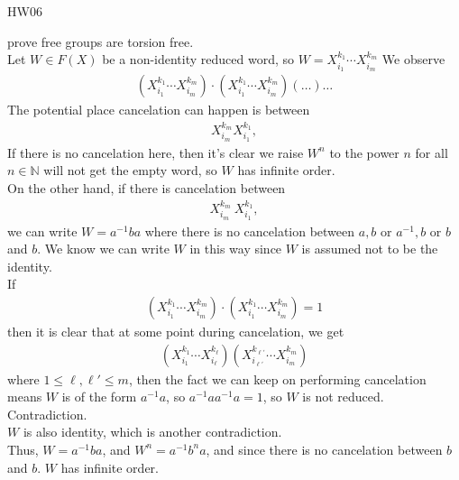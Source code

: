 \documentclass{article}
\begin{document}
\maketitle
HW06 \\
\pagebreak

\begin{homeworkProblem}

    \solution

    prove free groups are torsion free.\\
    Let $W \in F(X)$ be a non-identity reduced word,
    so $W = X_{i_1}^{k_1} \cdots X_{i_m}^{k_m}$
    We observe 
    \begin{align}
        \left( X_{i_1}^{k_1} \cdots X_{i_m}^{k_m} \right) \cdot \left( X_{i_1}^{k_1} \cdots X_{i_m}^{k_m} \right) \left( \ldots \right) \ldots
    \end{align}
    The potential place cancelation can happen is between 
    \begin{align}
        X_{i_m}^{k_m} X_{i_1}^{k_1},
    \end{align}
    If there is no cancelation here, then it's clear we 
    raise $W^n$ to the power $n$ for all $n \in \mathbb{N}$
    will not get the empty word, so $W$ has infinite order.\\
    On the other hand, if there  is cancelation between 
    \begin{align}
        X_{i_m}^{k_m} \ X_{i_1}^{k_1},
    \end{align}
    we can write $W = a^{-1} b a$ where there is 
    no cancelation between $a, b$ or 
    $a^{-1}, b$ or $b$ and $b$. We know
    we can write $W$ in this way since 
    $W$ is assumed not to be the identity.\\
    If 
    \begin{align}
        \left( X_{i_1}^{k_1} \cdots X_{i_m}^{k_m} \right) \cdot \left( X_{i_1}^{k_1} \cdots X_{i_m}^{k_m} \right) = 1
    \end{align}
    then it is clear that at some point during cancelation, we get
    \begin{align}
        \left( X_{i_1}^{k_1} \cdots X_{i_{\ell}}^{k_{\ell}} \right) \left( X_{i_{\ell'}}^{k_{\ell'}} \cdots X_{i_m}^{k_m}\right)
    \end{align}
    where $1 \leq \ell, \ell' \leq m$, then the fact we can keep on performing 
    cancelation means $W$ is of the form $a^{-1}a$, so 
    $a^{-1} a a^{-1} a = 1$, so $W$ is not reduced. Contradiction.\\
    $W$ is also identity, which is another contradiction.\\

    Thus, $W = a^{-1} b a$, and $W^n = a^{-1} b^n a$, 
    and since there is no cancelation between $b$ and $b$. 
    $W$ has infinite order. 
    

\end{homeworkProblem}
\end{document}
